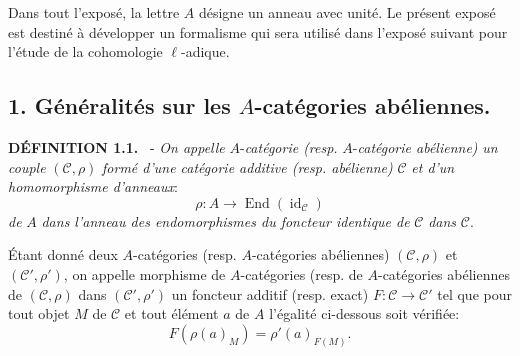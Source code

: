 \documentclass[11pt]{article}
\newenvironment{statement}[1]{\par\medskip\noindent\textbf{#1.}\ }{\par\medskip}
\providecommand{\id}{\operatorname{id}}
\providecommand{\cC}{\mathcal C}
\providecommand{\End}{\operatorname{End}}
\providecommand{\id}{\operatorname{id}}
\providecommand{\id}{\operatorname{id}}
\providecommand{\End}{\operatorname{End}}
\providecommand{\id}{\operatorname{id}}
\providecommand{\id}{\operatorname{id}}
\providecommand{\cC}{\mathcal C}
\providecommand{\id}{\operatorname{id}}
\begin{document}
Dans tout l'exposé, la lettre $A$ désigne un anneau avec unité. Le présent exposé est destiné à développer un formalisme qui sera utilisé dans l'exposé suivant pour l'étude de la cohomologie $\ell$-adique.

\subsection*{1. Généralités sur les $A$-catégories abéliennes.}

\begin{statement}{DÉFINITION 1.1}
- \emph{On appelle} $A$-\emph{catégorie (resp.} $A$-\emph{catégorie abélienne)} \emph{un couple} $(\cC,\rho)$ \emph{formé d'une catégorie additive (resp. abélienne)} $\cC$ \emph{et d'un homomorphisme d'anneaux}:
\[
\rho:A\longrightarrow \End(\id_{\cC})
\]
\emph{de} $A$ \emph{dans l'anneau des endomorphismes du foncteur identique de} $\cC$ \emph{dans} $\cC$.
\end{statement}

Étant donné deux $A$-catégories (resp. $A$-catégories abéliennes) $(\cC,\rho)$ et $(\cC',\rho')$, on appelle morphisme de $A$-catégories (resp. de $A$-catégories abéliennes de $(\cC,\rho)$ dans $(\cC',\rho')$ un foncteur additif (resp. exact) $F:\cC\to\cC'$ tel que pour tout objet $M$ de $\cC$ et tout élément $a$ de $A$ l'égalité ci-dessous soit vérifiée:
\[
F(\rho(a)_M)=\rho'(a)_{F(M)}.
\]
\end{document}

